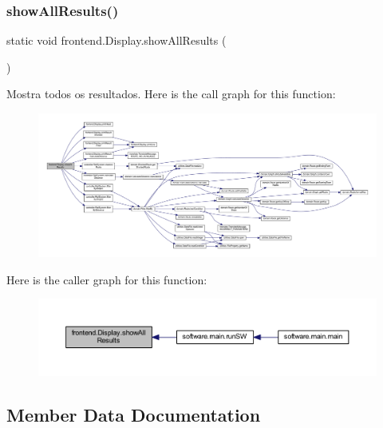 \subsubsection{\texorpdfstring{show\+All\+Results()}{showAllResults()}}
{\footnotesize\ttfamily static void frontend.\+Display.\+show\+All\+Results (\begin{DoxyParamCaption}{ }\end{DoxyParamCaption})\hspace{0.3cm}{\ttfamily [static]}}

Mostra todos os resultados. Here is the call graph for this function\+:\nopagebreak
\begin{figure}[H]
\begin{center}
\leavevmode
\includegraphics[width=350pt]{classfrontend_1_1_display_a80dcb9108b718e006f2f97f287619236_cgraph}
\end{center}
\end{figure}
Here is the caller graph for this function\+:\nopagebreak
\begin{figure}[H]
\begin{center}
\leavevmode
\includegraphics[width=350pt]{classfrontend_1_1_display_a80dcb9108b718e006f2f97f287619236_icgraph}
\end{center}
\end{figure}


\subsection{Member Data Documentation}
\mbox{\label{classfrontend_1_1_display_a3a734a034b56b660fdba49e5c5283978}} 
